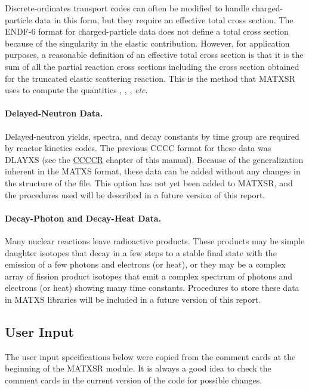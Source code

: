 Discrete-ordinates transport codes can often be modified to handle
charged-particle data in this form, but they require an effective
total cross section.  The ENDF-6 format for charged-particle data
does not define a total cross section because of the singularity in
the elastic contribution.  However, for application purposes, a
reasonable definition of an effective total cross section is that it
is the sum of all the partial reaction cross sections including the
cross section obtained for the truncated elastic scattering reaction.
This is the method that MATXSR
uses to compute the quantities
, , , {\it etc}.

\paragraph{Delayed-Neutron Data.}
Delayed-neutron yields, spectra, and decay constants by time group are
required by reactor kinetics codes.  The previous CCCC format for these
data was DLAYXS (see the \hyperlink{sCCCCRhy}{CCCCR} chapter
of this manual).  Because of the
generalization inherent in the MATXS format, these data can be added
without any changes in the structure of the file.  This option has not
yet been added to MATXSR, and the
procedures used will be described
in a future version of this report.

\paragraph{Decay-Photon and Decay-Heat Data.}
Many nuclear reactions leave radioactive products.  These products
may be simple daughter isotopes that decay in a few steps to a
stable final state with the emission of a few photons and electrons
(or heat), or they may be a complex array of fission product isotopes
that emit a complex spectrum of photons and electrons (or heat) showing
many time constants.  Procedures to store these data in MATXS
libraries will be included in a future version of this report.

\subsection{User Input}
\label{ssMATXSR_inp}

The user input specifications below were copied from the comment
cards at the beginning of the MATXSR module.  It is always a good
idea to check the comment cards in the current version of the
code for possible changes.

